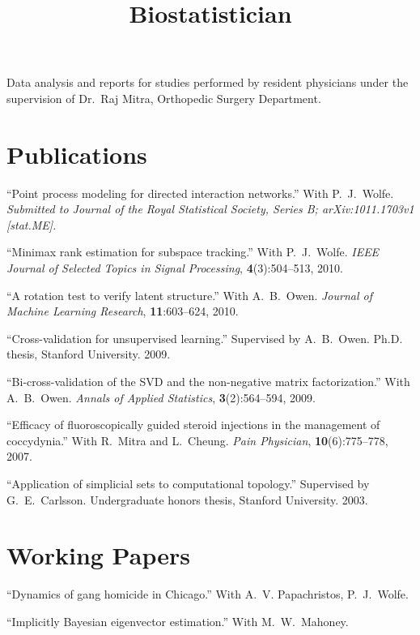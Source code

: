 \documentclass[overlapped,line,letterpaper]{res}
\begin{document}
\begin{resume}
\title{Biostatistician}
\begin{position}
    Data analysis and reports for studies performed by resident
    physicians under the supervision of Dr.~Raj Mitra, Orthopedic Surgery
    Department.
\end{position}


\section{\bf Publications}

``Point process modeling for directed interaction networks.''
With P.\ J.\ Wolfe.
\textit{Submitted to Journal of the Royal Statistical Society, Series B; arXiv:1011.1703v1 [stat.ME].}

``Minimax rank estimation for subspace tracking.''
With P.\ J.\ Wolfe.
\textit{IEEE Journal of Selected Topics in Signal Processing},
\textbf{4}(3):504--513, 2010.

``A rotation test to verify latent structure.''
With A.\ B.\ Owen.
\textit{Journal of Machine Learning Research},
\textbf{11}:603--624, 2010.

``Cross-validation for unsupervised learning.''
Supervised by A.\ B.\ Owen.
Ph.D. thesis, Stanford University. 2009.

``Bi-cross-validation of the SVD and the non-negative matrix factorization.''
With A.\ B.\ Owen.
\textit{Annals of Applied Statistics},
\textbf{3}(2):564--594, 2009.

``Efficacy of fluoroscopically guided steroid injections in the management of coccydynia.''
With R.\ Mitra and L.\ Cheung.
\textit{Pain Physician},
\textbf{10}(6):775--778, 2007.

``Application of simplicial sets to computational topology.''
Supervised by G.\ E.\ Carlsson.
Undergraduate honors thesis, Stanford University. 2003.

\section{\bf Working Papers}

``Dynamics of gang homicide in Chicago.''
With A.\ V. Papachristos, P.\ J.\ Wolfe.

``Implicitly Bayesian eigenvector estimation.''
With M.\ W.\ Mahoney.


\end{resume}
\end{document}
